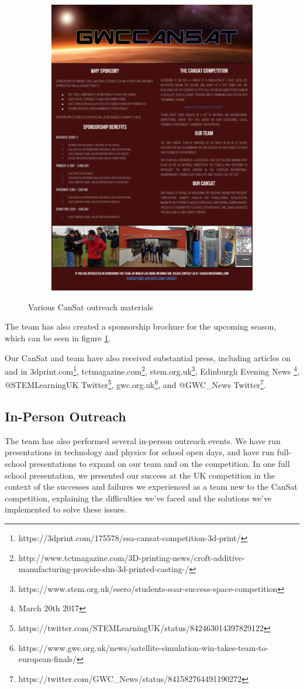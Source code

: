 \documentclass[]{report}
\begin{document}
\begin{figure}
\begin{subfigure}{.5\textwidth}
		\includegraphics[width=0.8\linewidth, angle=0]{brochure.png}
	\end{subfigure}
	\caption{Various CanSat outreach materials}
	\label{smedia}
\end{figure}

The team has also created a sponsorship brochure for the upcoming season, which can be seen in figure \ref{smedia}.

Our CanSat and team have also received substantial press, including articles on and in 3dprint.com\footnote{https://3dprint.com/175578/esa-cansat-competition-3d-print/}, tctmagazine.com\footnote{http://www.tctmagazine.com/3D-printing-news/croft-additive-manufacturing-provide-slm-3d-printed-casting-/}, stem.org.uk\footnote{https://www.stem.org.uk/esero/students-soar-success-space-competition}, Edinburgh Evening News \footnote{March 20th 2017}, @STEMLearningUK Twitter\footnote{https://twitter.com/STEMLearningUK/status/842463014397829122}, gwc.org.uk\footnote{https://www.gwc.org.uk/news/satellite-simulation-win-takes-team-to-european-finals/}, and @GWC\_News Twitter\footnote{https://twitter.com/GWC\_News/status/841582764491190272}.
\subsection{In-Person Outreach}
The team has also performed several in-person outreach events. We have run presentations in technology and physics for school open days, and have run full-school presentations to expand on our team and on the competition. In one full school presentation, we presented our success at the UK competition in the context of the successes and failures we experienced as a team new to the CanSat competition, explaining the difficulties we've faced and the solutions we've implemented to solve these issues.
\end{document}
